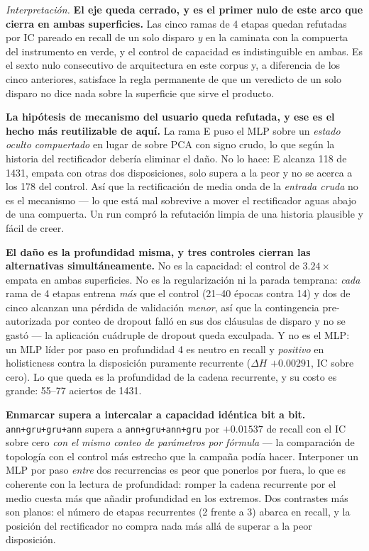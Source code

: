 \documentclass[11pt]{article}
\begin{document}
\emph{Interpretación.} \textbf{El eje queda cerrado, y es el primer nulo de este
arco que cierra en ambas superficies.} Las cinco ramas de 4 etapas quedan refutadas
por IC pareado en recall de un solo disparo \emph{y} en la caminata con la compuerta
del instrumento en verde, y el control de capacidad es indistinguible en ambas. Es
el sexto nulo consecutivo de arquitectura en este corpus y, a diferencia de los
cinco anteriores, satisface la regla permanente de que un veredicto de un solo
disparo no dice nada sobre la superficie que sirve el producto.

\textbf{La hipótesis de mecanismo del usuario queda refutada, y ese es el hecho más
reutilizable de aquí.} La rama E puso el MLP sobre un \emph{estado oculto
compuertado} en lugar de sobre PCA con signo crudo, lo que según la historia del
rectificador debería eliminar el daño. No lo hace: E alcanza \num{118} de
\num{1431}, empata con otras dos disposiciones, solo supera a la peor y no se acerca
a los \num{178} del control. Así que la rectificación de media onda de la
\emph{entrada cruda} no es el mecanismo --- lo que está mal sobrevive a mover el
rectificador aguas abajo de una compuerta. Un run compró la refutación limpia de una
historia plausible y fácil de creer.

\textbf{El daño es la profundidad misma, y tres controles cierran las alternativas
simultáneamente.} No es la capacidad: el control de $\num{3.24}\times$ empata en
ambas superficies. No es la regularización ni la parada temprana: \emph{cada} rama
de 4 etapas entrena \emph{más} que el control (\numrange{21}{40} épocas contra
\num{14}) y dos de cinco alcanzan una pérdida de validación \emph{menor}, así que la
contingencia pre-autorizada por conteo de dropout falló en sus dos cláusulas de
disparo y no se gastó --- la aplicación cuádruple de dropout queda exculpada. Y no es
el MLP: un MLP líder por paso en profundidad 4 es neutro en recall y
\emph{positivo} en holisticness contra la disposición puramente recurrente
($\Delta H$ $+\num{0.00291}$, IC sobre cero). Lo que queda es la profundidad de la
cadena recurrente, y su costo es grande: \numrange{55}{77} aciertos de \num{1431}.

\textbf{Enmarcar supera a intercalar a capacidad idéntica bit a bit.}
\texttt{ann+gru+gru+ann} supera a \texttt{ann+gru+ann+gru} por $+\num{0.01537}$ de
recall con el IC sobre cero \emph{con el mismo conteo de parámetros por fórmula} ---
la comparación de topología con el control más estrecho que la campaña podía hacer.
Interponer un MLP por paso \emph{entre} dos recurrencias es peor que ponerlos por
fuera, lo que es coherente con la lectura de profundidad: romper la cadena
recurrente por el medio cuesta más que añadir profundidad en los extremos. Dos
contrastes más son planos: el número de etapas recurrentes (2 frente a 3) abarca en
recall, y la posición del rectificador no compra nada más allá de superar a la peor
disposición.
\end{document}
